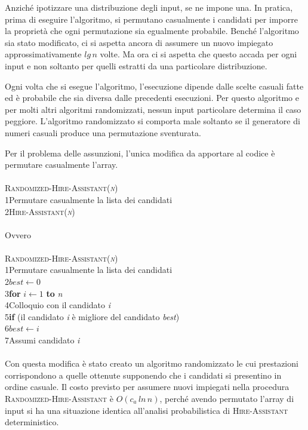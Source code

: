 \documentclass[10pt, a4paper]{report}
\newcommand\firsttab[1][0.5cm]{\hspace*{#1}}
\newcommand\secondtab[1][1cm]{\hspace*{#1}}
\newcommand\thirdtab[1][1.5cm]{\hspace*{#1}}
\begin{document}
Anziché ipotizzare una distribuzione degli input, se ne impone una. In pratica, prima di eseguire l'algoritmo, si permutano casualmente i candidati per imporre la proprietà che ogni permutazione sia egualmente probabile. Benché l'algoritmo sia stato modificato, ci si aspetta ancora di assumere un nuovo impiegato approssimativamente $lg\,n$ volte. Ma ora ci si aspetta che questo accada per ogni input e non soltanto per quelli estratti da una particolare distribuzione.

Ogni volta che si esegue l'algoritmo, l'esecuzione dipende dalle scelte casuali fatte ed è probabile che sia diversa dalle precedenti esecuzioni. Per questo algoritmo e per molti altri algoritmi randomizzati, nessun input particolare determina il caso peggiore. L'algoritmo randomizzato si comporta male soltanto se il generatore di numeri casuali produce una permutazione sventurata.

Per il problema delle assunzioni, l'unica modifica da apportare al codice è permutare casualmente l'array.\\\\
\textsc{Randomized-Hire-Assistant(\textit{n})}\\
1\firsttab Permutare casualmente la lista dei candidati\\
2\firsttab\textsc{Hire-Assistant(\textit{n})}\\\\
Ovvero\\\\
\textsc{Randomized-Hire-Assistant(\textit{n})}\\
1\firsttab Permutare casualmente la lista dei candidati\\
2\firsttab $best \leftarrow 0$\\
3\firsttab\textbf{for} $i \leftarrow 1$ \textbf{to} \textit{n}\\
4\secondtab Colloquio con il candidato \textit{i}\\
5\secondtab\textbf{if} (il candidato \textit{i} è migliore del candidato \textit{best})\\
6\thirdtab$best \leftarrow i$\\
7\thirdtab Assumi candidato \textit{i}\\\\
Con questa modifica è stato creato un algoritmo  randomizzato le cui prestazioni corrispondono a quelle ottenute supponendo che i candidati si presentino in ordine casuale. Il costo previsto per assumere nuovi impiegati nella procedura \textsc{Randomized-Hire-Assistant} è $O(c_a\,ln\,n)$, perché avendo permutato l'array di input si ha una situazione identica all'analisi probabilistica di \textsc{Hire-Assistant} deterministico.
\end{document}
